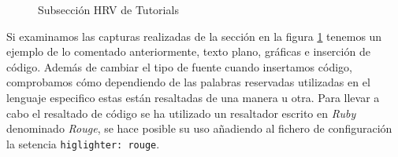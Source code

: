 \begin{figure}[h!]
    \centering
    \par
    \par
    \caption{Subsección HRV de Tutorials}
    \label{fig:hrvWeb}
\end{figure}

Si examinamos las capturas realizadas de la sección en la figura \ref{fig:hrvWeb} tenemos un ejemplo de lo comentado anteriormente, texto plano, gráficas e inserción de código. Además de cambiar el tipo de fuente cuando insertamos código, comprobamos cómo dependiendo de las palabras reservadas utilizadas en el lenguaje especifico estas están resaltadas de una manera u otra. Para llevar a cabo el resaltado de código se ha utilizado un resaltador escrito en  \textit{Ruby} denominado \textit{Rouge}, se hace posible su uso añadiendo al fichero de configuración la setencia \texttt{higlighter: rouge}.

